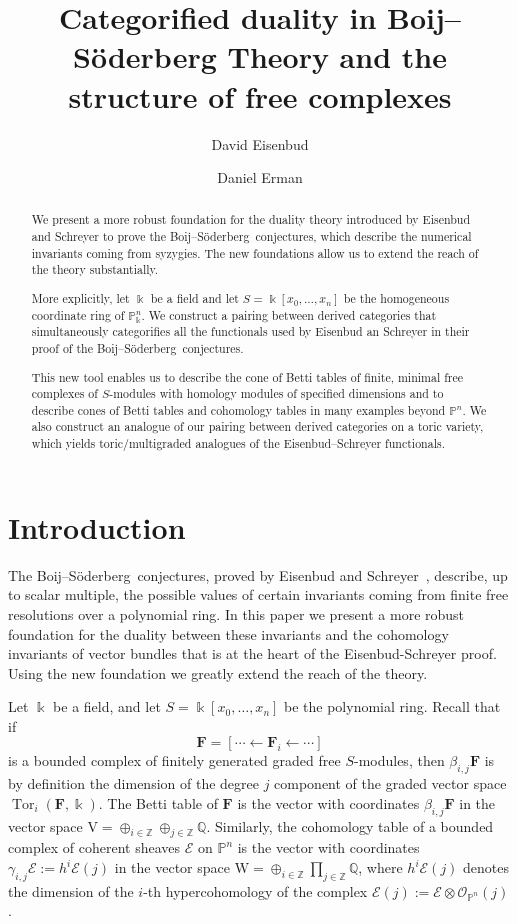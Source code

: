 \documentclass[12pt]{amsart}
\title{Categorified duality in Boij--S\"oderberg Theory and the structure of free complexes}
\author{David Eisenbud}
\author{Daniel Erman}\thanks{The first author was partially supported by an NSF grant, and the second author was partially supported by an NSF fellowship and by a Simons Foundation fellowship.}
\theoremstyle{definition}
\theoremstyle{remark}
\newcommand{\Tor}{\operatorname{Tor}}
\newcommand{\kk}{\Bbbk}
\newcommand{\PP}{\mathbb{P}}
\newcommand{\ZZ}{\mathbb{Z}}
\newcommand{\QQ}{\mathbb{Q}}
\newcommand{\VV}{\mathrm{V}}
\newcommand{\WW}{\mathrm{W}}
\newcommand{\cO}{\mathcal{O}}
\newcommand{\cE}{\mathcal{E}}
\newcommand{\FF}{\mathbf{F}}
\newcommand{\defi}[1]{\textsf{#1}} %
\def\BS{Boij--S\"oderberg~}
\begin{document}
\begin{abstract} We present a more robust foundation for the duality theory introduced by Eisenbud and Schreyer to prove the \BS conjectures, which describe the numerical invariants coming from syzygies.
The new foundations allow us to extend the reach of the theory substantially.

More explicitly, let $\kk$ be a field and let $S = \kk[x_{0}, \dots,x_{n}]$ be the homogeneous coordinate ring of $\PP^{n}_{\kk}$.
We construct a pairing between derived categories that
simultaneously categorifies all the functionals used by Eisenbud an Schreyer in their proof of the \BS conjectures.

This new tool enables us to describe the cone of Betti tables of finite, minimal free complexes of $S$-modules with homology modules of specified dimensions and  to describe cones of Betti tables and cohomology tables in many examples beyond $\PP^n$. We also construct an analogue of our pairing between derived categories on a toric variety, which yields toric/multigraded analogues of the Eisenbud--Schreyer functionals.
\end{abstract}

\maketitle

\tableofcontents


\section*{Introduction}
The \BS conjectures, proved by Eisenbud and Schreyer~\cite{eis-schrey1}, describe, up to scalar multiple, the possible values of certain invariants coming from finite free resolutions over a polynomial ring. In this paper we present a more robust foundation for the duality between these invariants and the cohomology invariants of vector bundles that is at the heart of the Eisenbud-Schreyer proof. Using the new foundation we greatly extend the reach of the theory.

Let $\kk$ be a field, and let $S=\kk[x_0, \dots, x_n]$ be the polynomial ring. Recall that if 
$$
\FF= [\cdots \gets \FF_i \gets \cdots ]
$$
is a bounded complex of finitely generated graded free $S$-modules, then $\beta_{i,j}\FF$ is by definition the dimension of the degree $j$ component of the graded vector space $\Tor_i(\FF,\kk)$.  The \defi{Betti table} of $\FF$ is the vector with coordinates $\beta_{i,j}\FF$ in the vector space $\VV = \oplus_{i\in \ZZ} \oplus_{j\in \ZZ}\QQ$. Similarly, the \defi{cohomology table} of a bounded complex of coherent sheaves $\cE$ on $\PP^{n}$ is the vector with coordinates $\gamma_{i,j}\cE := h^{i}\cE(j)$ in the vector space $\WW = \oplus_{i\in \ZZ}\prod_{j\in \ZZ}\QQ$, where $h^{i}\cE(j)$ denotes the dimension of the $i$-th hypercohomology of the complex $\cE(j) := \cE \otimes \cO_{\PP^{n}}(j)$. 
\end{document}
